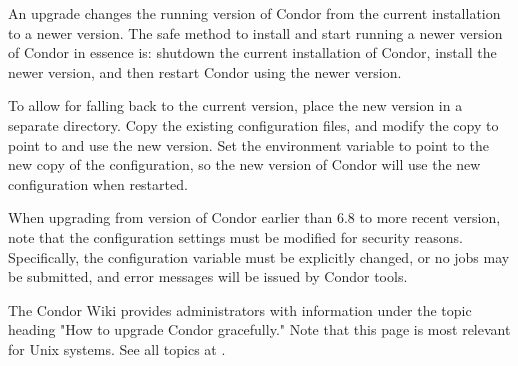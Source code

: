 An upgrade changes the running version of Condor 
from the current installation to a newer version.
The safe method 
to install and start running a newer version of Condor 
in essence is:
shutdown the current installation of Condor,
install the newer version,
and then restart Condor using the newer version.

To allow for falling back to the current version,
place the new version in a separate directory.
Copy the existing configuration files,
and modify the copy to point to and use the new version.
Set the  environment variable
to point to the new copy of the configuration,
so the new version of Condor will use the new configuration
when restarted.

When upgrading from version of Condor earlier than 6.8 to more recent version,
note that the configuration settings must be modified for security reasons. 
Specifically, the  configuration variable
must be explicitly changed,
or no jobs may be submitted,
and error messages will be issued by Condor tools.

The Condor Wiki provides administrators with information under the
topic heading "How to upgrade Condor gracefully."
Note that this page is most relevant for Unix systems.
See all topics at 
.




